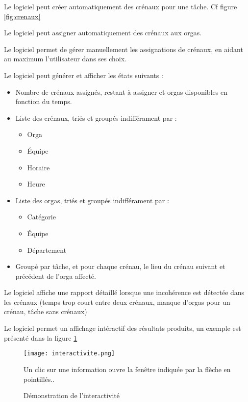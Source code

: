 Le logiciel peut créer automatiquement des crénaux pour une tâche. Cf figure \ref{fig:crenaux}

Le logiciel peut assigner automatiquement des crénaux aux orgas.

Le logiciel permet de gérer manuellement les assignations de crénaux, en aidant au maximum l'utilisateur dans ses choix.

Le logiciel peut générer et afficher les états suivants : 

\begin{itemize}
\item Nombre de crénaux assignés, restant à assigner et orgas disponibles en fonction du temps.
\item Liste des crénaux, triés et groupés indifférament par : 	\begin{itemize}
								  \item Orga
								  \item Équipe
								  \item Horaire
\item Heure
								 \end{itemize}
\item Liste des orgas, triés et groupés indifférament par :  	\begin{itemize}
								  \item Catégorie
								  \item Équipe
								  \item Département
								 \end{itemize}
\item Groupé par tâche, et pour chaque crénau, le lieu du crénau suivant et précédent de l'orga affecté.

\end{itemize}

Le logiciel affiche une rapport détaillé lorsque une incohérence est détectée dans les crénaux (temps trop court entre deux crénaux, manque d'orgas pour un crénau, tâche sans crénaux)



Le logiciel permet un affichage intéractif des résultats produits, un exemple est présenté dans la figure \ref{fig:interactivite}

\begin{figure}[h!t]
\centering
\texttt{[image: interactivite.png]}

Un clic sur une information ouvre la fenêtre indiquée par la flèche en pointillés..
\caption{Démonstration de l'interactivité}
\label{fig:interactivite}
\end{figure}


